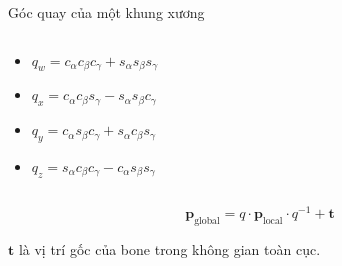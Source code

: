 \begin{frame}{Góc quay của một khung xương}
\begin{columns}
\begin{column}{0.5\textwidth}
\begin{itemize}
				\item $q_w = c_{\alpha} c_{\beta} c_{\gamma} + s_{\alpha} s_{\beta} s_{\gamma}$
				\item $q_x = c_{\alpha} c_{\beta} s_{\gamma} - s_{\alpha} s_{\beta} c_{\gamma}$
				\item $q_y = c_{\alpha} s_{\beta} c_{\gamma} + s_{\alpha} c_{\beta} s_{\gamma}$
				\item $q_z = s_{\alpha} c_{\beta} c_{\gamma} - c_{\alpha} s_{\beta} s_{\gamma}$
			\end{itemize}
		\end{column}
	\end{columns}
	\begin{equation}
	\mathbf{p}_{\text{global}} = q \cdot \mathbf{p}_{\text{local}} \cdot q^{-1} + \mathbf{t}
	\end{equation}
	
	$\mathbf{t}$ là vị trí gốc của bone trong không gian toàn cục.
\end{frame}


